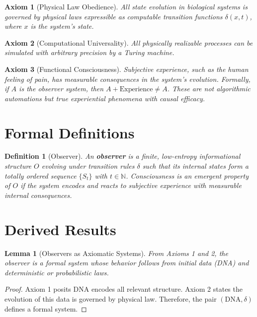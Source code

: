 \documentclass[11pt]{article}
\newtheorem{axiom}{Axiom}
\newtheorem{definition}{Definition}
\newtheorem{lemma}{Lemma}
\begin{document}
\begin{axiom}[Physical Law Obedience]
All state evolution in biological systems is governed by physical laws expressible as computable transition functions $\delta(x, t)$, where $x$ is the system's state.
\end{axiom}

\begin{axiom}[Computational Universality]
All physically realizable processes can be simulated with arbitrary precision by a Turing machine.
\end{axiom}

\begin{axiom}[Functional Consciousness]
Subjective experience, such as the human feeling of pain, has measurable consequences in the system's evolution. Formally, if $A$ is the observer system, then $A + \text{Experience} \neq A$. These are not algorithmic automations but true experiential phenomena with causal efficacy.
\end{axiom}

\section{Formal Definitions}

\begin{definition}[Observer]
An \textbf{observer} is a finite, low-entropy informational structure $O$ evolving under transition rules $\delta$ such that its internal states form a totally ordered sequence $\{S_t\}$ with $t \in \mathbb{N}$. Consciousness is an emergent property of $O$ if the system encodes and reacts to subjective experience with measurable internal consequences.
\end{definition}

\section{Derived Results}

\begin{lemma}[Observers as Axiomatic Systems]
From Axioms 1 and 2, the observer is a formal system whose behavior follows from initial data (DNA) and deterministic or probabilistic laws.
\end{lemma}
\begin{proof}
Axiom 1 posits DNA encodes all relevant structure. Axiom 2 states the evolution of this data is governed by physical law. Therefore, the pair $(\text{DNA}, \delta)$ defines a formal system.
\end{proof}
\end{document}
